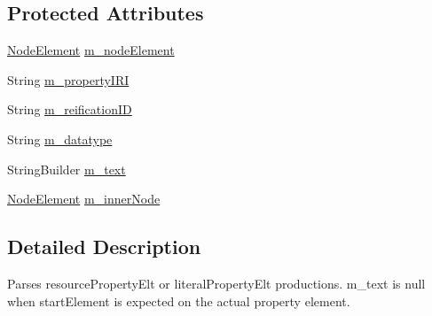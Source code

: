 \subsection*{Protected Attributes}
\begin{DoxyCompactItemize}
\item 
\hyperlink{classorg_1_1semanticweb_1_1owlapi_1_1rdf_1_1syntax_1_1_r_d_f_parser_1_1_node_element}{Node\-Element} \hyperlink{classorg_1_1semanticweb_1_1owlapi_1_1rdf_1_1syntax_1_1_r_d_f_parser_1_1_resource_or_literal_property_element_aaaf321b478d720dffd194cf704e788c9}{m\-\_\-node\-Element}
\item 
String \hyperlink{classorg_1_1semanticweb_1_1owlapi_1_1rdf_1_1syntax_1_1_r_d_f_parser_1_1_resource_or_literal_property_element_aab383d4264bf2728b2a6c0c0c010f538}{m\-\_\-property\-I\-R\-I}
\item 
String \hyperlink{classorg_1_1semanticweb_1_1owlapi_1_1rdf_1_1syntax_1_1_r_d_f_parser_1_1_resource_or_literal_property_element_afac38eeafb845be165b1bcc4d2025d40}{m\-\_\-reification\-I\-D}
\item 
String \hyperlink{classorg_1_1semanticweb_1_1owlapi_1_1rdf_1_1syntax_1_1_r_d_f_parser_1_1_resource_or_literal_property_element_a991a9912dade1c050d710c47b70c2a33}{m\-\_\-datatype}
\item 
String\-Builder \hyperlink{classorg_1_1semanticweb_1_1owlapi_1_1rdf_1_1syntax_1_1_r_d_f_parser_1_1_resource_or_literal_property_element_a65f5f6c898c6e22e6198cbaed341d042}{m\-\_\-text}
\item 
\hyperlink{classorg_1_1semanticweb_1_1owlapi_1_1rdf_1_1syntax_1_1_r_d_f_parser_1_1_node_element}{Node\-Element} \hyperlink{classorg_1_1semanticweb_1_1owlapi_1_1rdf_1_1syntax_1_1_r_d_f_parser_1_1_resource_or_literal_property_element_aa9398293857be27a1b2d94e06677ba7e}{m\-\_\-inner\-Node}
\end{DoxyCompactItemize}


\subsection{Detailed Description}
Parses resource\-Property\-Elt or literal\-Property\-Elt productions. m\-\_\-text is {\ttfamily null} when start\-Element is expected on the actual property element. 

